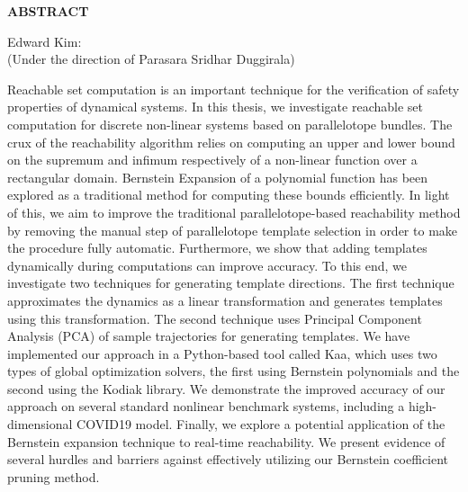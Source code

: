 \begin{center}
\vspace*{52pt}
{\fontsize{12pt}{14.4pt}\selectfont \textbf{ABSTRACT}}
\vspace{11pt}

\begin{singlespace}
Edward Kim: \thesistitle \\
(Under the direction of Parasara Sridhar Duggirala)
\end{singlespace}

\end{center}
\par Reachable set computation is an important technique for the verification of safety properties of dynamical systems.
%
In this thesis, we investigate reachable set computation for discrete non-linear systems based on parallelotope bundles.
%
The crux of the reachability algorithm relies on computing an upper and lower bound on the supremum and infimum respectively of a non-linear function over a rectangular domain.
%
Bernstein Expansion of a polynomial function has been explored as a traditional method for computing these bounds efficiently.
%
In light of this, we aim to improve the traditional parallelotope-based reachability method by removing the manual step of parallelotope template selection in order to make the procedure fully automatic.
%
Furthermore, we show that adding templates dynamically during computations can improve accuracy.
%
To this end, we investigate two techniques for generating template directions.
%
The first technique approximates the dynamics as a linear transformation and generates templates using this transformation.
%
The second technique uses Principal Component Analysis (PCA) of sample trajectories for generating templates.
%
We have implemented our approach in a Python-based tool called Kaa, which uses two types of global optimization solvers, the first using Bernstein polynomials and the second using
the Kodiak library.
%
We demonstrate the improved accuracy of our approach on several standard nonlinear benchmark systems, including a high-dimensional COVID19 model.
%
Finally, we explore a potential application of the Bernstein expansion technique to real-time reachability.
%
We present evidence of several hurdles and barriers against effectively utilizing our Bernstein coefficient pruning method.
\clearpage

